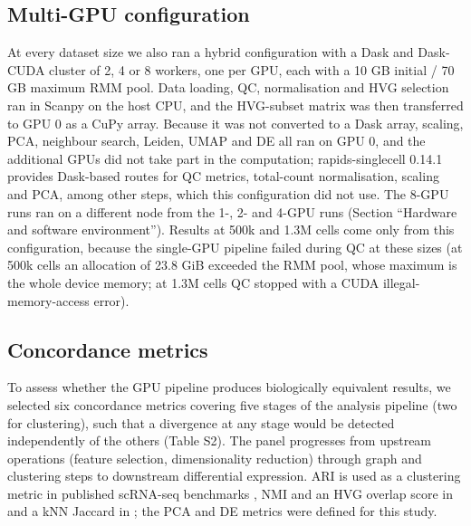 \documentclass[runningheads]{llncs}
\begin{document}
\hypertarget{multi-gpu-configuration}{%
\subsection{Multi-GPU configuration}\label{multi-gpu-configuration}}

At every dataset size we also ran a hybrid configuration with a Dask \cite{Rocklin2015} and Dask-CUDA \cite{RAPIDS2024} cluster of 2, 4 or 8 workers, one per GPU, each with a 10 GB initial / 70 GB maximum RMM pool. Data loading, QC, normalisation and HVG selection ran in Scanpy on the host CPU, and the HVG-subset matrix was then transferred to GPU 0 as a CuPy array. Because it was not converted to a Dask array, scaling, PCA, neighbour search, Leiden, UMAP and DE all ran on GPU 0, and the additional GPUs did not take part in the computation; rapids-singlecell 0.14.1 provides Dask-based routes for QC metrics, total-count normalisation, scaling and PCA, among other steps, which this configuration did not use. The 8-GPU runs ran on a different node from the 1-, 2- and 4-GPU runs (Section ``Hardware and software environment''). Results at 500k and 1.3M cells come only from this configuration, because the single-GPU pipeline failed during QC at these sizes (at 500k cells an allocation of 23.8 GiB exceeded the RMM pool, whose maximum is the whole device memory; at 1.3M cells QC stopped with a CUDA illegal-memory-access error).

\hypertarget{concordance-metrics}{%
\subsection{Concordance metrics}\label{concordance-metrics}}

To assess whether the GPU pipeline produces biologically equivalent results, we selected six concordance metrics covering five stages of the analysis pipeline (two for clustering), such that a divergence at any stage would be detected independently of the others (Table S2). The panel progresses from upstream operations (feature selection, dimensionality reduction) through graph and clustering steps to downstream differential expression. ARI is used as a clustering metric in published scRNA-seq benchmarks \cite{Tian2019,Duo2020,Luecken2022}, NMI and an HVG overlap score in \cite{Luecken2022} and a kNN Jaccard in \cite{Gardner2025}; the PCA and DE metrics were defined for this study.
\end{document}
